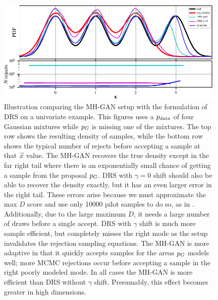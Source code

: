 \begin{figure}[htbp]
    \centering
    \includegraphics[scale=1.0]{figures/univariate_example.pdf}
    \caption{{\small
    Illustration comparing the MH-GAN setup with the formulation of DRS on a univariate example.
    This figures uses a ${p_{\textrm{data}}}$ of four Gaussian mixtures while ${p_G}$ is missing one of the mixtures.
    The top row shows the resulting density of samples, while the bottom row shows the typical number of rejects before accepting a sample at that $\vec x$ value.
    The MH-GAN recovers the true density except in the far right tail where there is an exponentially small chance of getting a sample from the proposal ${p_G}$.
    DRS with $\gamma=0$ shift should also be able to recover the density exactly, but it has an even larger error in the right tail.
    These errors arise because we must approximate the max $D$ score and use only \num{10000} pilot samples to do so, as in \citet{Azadi2018}.
    Additionally, due to the large maximum $D$, it needs a large number of draws before a single accept.
    DRS with $\gamma$ shift is much more sample efficient, but completely misses the right mode as the setup invalidates the rejection sampling equations.
    The MH-GAN is more adaptive in that it quickly accepts samples for the areas ${p_G}$ models well; more MCMC rejections occur before accepting a sample in the right poorly modeled mode.
    In all cases the MH-GAN is more efficient than DRS without $\gamma$ shift.
    Presumably, this effect becomes greater in high dimensions.
    }}
    \label{fig:univariate_example}
\end{figure}

